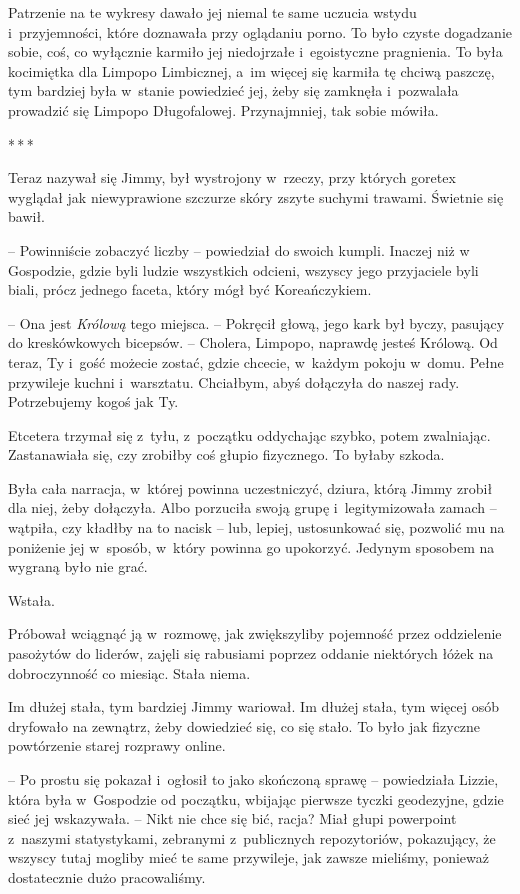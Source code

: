 \documentclass[oneside,polish,11pt,sfheadings]{mwbk}
\newcommand{\threeast}{\bigskip\par\centerline{*\,*\,*}\medskip\par}
\begin{document}
Patrzenie na te wykresy dawało jej niemal te same uczucia wstydu i~przyjemności, które doznawała przy oglądaniu porno. To było czyste
dogadzanie sobie, coś, co wyłącznie karmiło jej niedojrzałe i~egoistyczne pragnienia. To była kocimiętka dla Limpopo Limbicznej, a~im
więcej się karmiła tę chciwą paszczę, tym bardziej była w~stanie
powiedzieć jej, żeby się zamknęła i~pozwalała prowadzić się Limpopo
Długofalowej. Przynajmniej, tak sobie mówiła.

\threeast

Teraz nazywał się Jimmy, był wystrojony w~rzeczy, przy których goretex
wyglądał jak niewyprawione szczurze skóry zszyte suchymi trawami.
Świetnie się bawił.

-- Powinniście zobaczyć liczby -- powiedział do swoich kumpli. Inaczej niż
w Gospodzie, gdzie byli ludzie wszystkich odcieni, wszyscy jego
przyjaciele byli biali, prócz jednego faceta, który mógł być
Koreańczykiem. 

-- Ona jest \textit{Królową} tego miejsca. -- Pokręcił głową,
jego kark był byczy, pasujący do kreskówkowych bicepsów. -- Cholera,
Limpopo, naprawdę jesteś Królową. Od teraz, Ty i~gość możecie zostać,
gdzie chcecie, w~każdym pokoju w~domu. Pełne przywileje kuchni i~warsztatu. Chciałbym, abyś dołączyła do naszej rady. Potrzebujemy kogoś
jak Ty.

Etcetera trzymał się z~tyłu, z~początku oddychając szybko, potem
zwalniając. Zastanawiała się, czy zrobiłby coś głupio fizycznego. To
byłaby szkoda.

Była cała narracja, w~której powinna uczestniczyć, dziura, którą Jimmy
zrobił dla niej, żeby dołączyła. Albo porzuciła swoją grupę i~legitymizowała zamach -- wątpiła, czy kładłby na to nacisk -- lub, lepiej,
ustosunkować się, pozwolić mu na poniżenie jej w~sposób, w~który powinna
go upokorzyć. Jedynym sposobem na wygraną było nie grać.

Wstała.

Próbował wciągnąć ją w~rozmowę, jak zwiększyliby pojemność przez
oddzielenie pasożytów do liderów, zajęli się rabusiami poprzez oddanie
niektórych łóżek na dobroczynność co miesiąc. Stała niema.

Im dłużej stała, tym bardziej Jimmy wariował. Im dłużej stała, tym
więcej osób dryfowało na zewnątrz, żeby dowiedzieć się, co się stało. To
było jak fizyczne powtórzenie starej rozprawy online.

-- Po prostu się pokazał i~ogłosił to jako skończoną sprawę -- powiedziała
Lizzie, która była w~Gospodzie od początku, wbijając pierwsze tyczki
geodezyjne, gdzie sieć jej wskazywała. -- Nikt nie chce się bić, racja?
Miał głupi powerpoint z~naszymi statystykami, zebranymi z~publicznych
repozytoriów, pokazujący, że wszyscy tutaj mogliby mieć te same
przywileje, jak zawsze mieliśmy, ponieważ dostatecznie dużo
pracowaliśmy.
\end{document}
